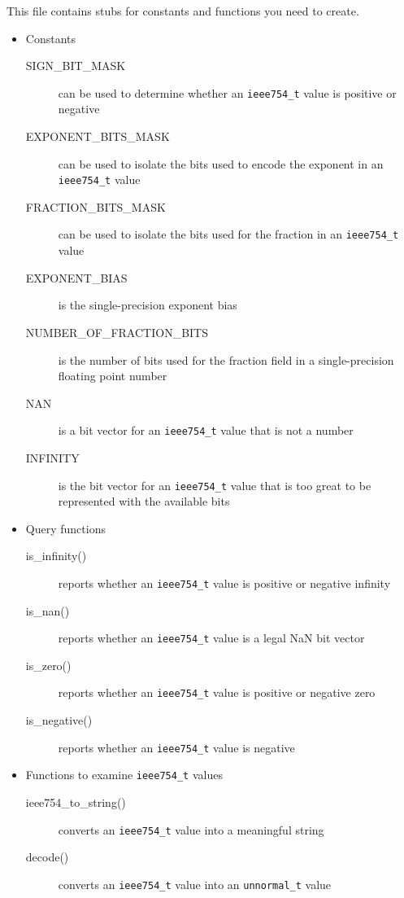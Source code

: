 This file contains stubs for constants and functions you need to create.
\begin{itemize}
    \item Constants
    \begin{description}
        \item[SIGN\_BIT\_MASK] can be used to determine whether an \lstinline{ieee754_t} value is positive or negative
        \item[EXPONENT\_BITS\_MASK] can be used to isolate the bits used to encode the exponent in an \lstinline{ieee754_t} value
        \item[FRACTION\_BITS\_MASK] can be used to isolate the bits used for the fraction in an \lstinline{ieee754_t} value
        \item[EXPONENT\_BIAS] is the single-precision exponent bias
        \item[NUMBER\_OF\_FRACTION\_BITS] is the number of bits used for the fraction field in a single-precision floating point number
        \item[NAN] is a bit vector for an \lstinline{ieee754_t} value that is not a number
        \item[INFINITY] is the bit vector for an \lstinline{ieee754_t} value that is too great to be represented with the available bits
    \end{description}
    \item Query functions
    \begin{description}
        \item[is\_infinity()] reports whether an \lstinline{ieee754_t} value is positive or negative infinity
        \item[is\_nan()] reports whether an \lstinline{ieee754_t} value is a legal NaN bit vector
        \item[is\_zero()] reports whether an \lstinline{ieee754_t} value is positive or negative zero
        \item[is\_negative()] reports whether an \lstinline{ieee754_t} value is negative
    \end{description}
    \item Functions to examine \lstinline{ieee754_t} values
    \begin{description}
        \item[ieee754\_to\_string()] converts an \lstinline{ieee754_t} value into a meaningful string
        \item[decode()] converts an \lstinline{ieee754_t} value into an \lstinline{unnormal_t} value
    \end{description}

\end{itemize}

